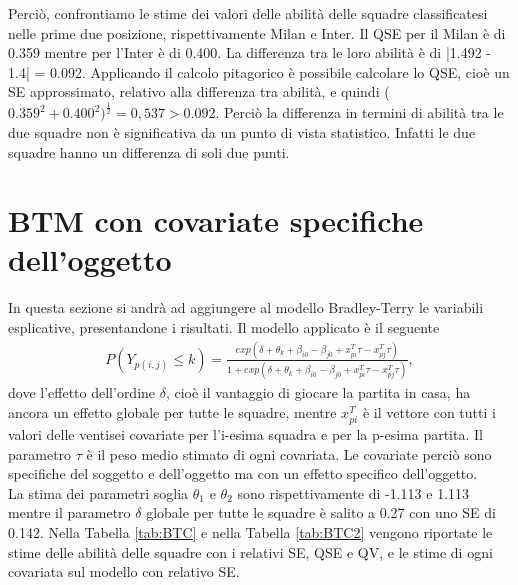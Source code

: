 Perciò, confrontiamo le stime dei valori delle abilità delle squadre classificatesi nelle prime due posizione, rispettivamente Milan e Inter. Il QSE per il Milan è di 0.359 mentre per l'Inter è di 0.400. La differenza tra le loro abilità è di |1.492 - 1.4| = 0.092. Applicando il calcolo pitagorico è possibile calcolare lo QSE, cioè un SE approssimato, relativo alla differenza tra abilità, e quindi ($0.359^2 + 0.400^2)^\frac{1}{2}=0,537 > 0.092$. Perciò la differenza in termini di abilità tra le due squadre non è significativa da un punto di vista statistico. Infatti le due squadre hanno un differenza di soli due punti.

\section{BTM con covariate specifiche dell'oggetto}
In questa sezione si andrà ad aggiungere al modello Bradley-Terry le variabili esplicative, presentandone i risultati. Il modello applicato è il seguente
\begin{align}
	P(Y_{p(i,j)}\leq k) =  \frac{exp(\delta + \theta_{k} + \beta_{i0} - \beta_{j0} + x^T_{pi}\tau - x^T_{pj}\tau)}{1 + exp(\delta + \theta_{k} + \beta_{i0} - \beta_{j0} + x^T_{pi}\tau - x^T_{pj}\tau)}, \label{for:5.1}
\end{align}
dove l'effetto dell'ordine $\delta$, cioè il vantaggio di giocare la partita in casa, ha ancora un effetto globale per tutte le squadre, mentre $x^T_{pi}$ è il vettore con tutti i valori delle ventisei covariate per l'i-esima squadra e per la p-esima partita. Il parametro $\tau$ è il peso medio stimato di ogni covariata. Le covariate perciò sono specifiche del soggetto e dell'oggetto ma con un effetto specifico dell'oggetto.\\
La stima dei parametri soglia $\theta_1$ e $\theta_2$ sono rispettivamente di -1.113 e 1.113 mentre il parametro $\delta$ globale per tutte le squadre è salito a 0.27 con uno SE di 0.142. Nella Tabella \ref{tab:BTC} e nella Tabella \ref{tab:BTC2} vengono riportate le stime delle abilità delle squadre con i relativi SE, QSE e QV, e le stime di ogni covariata sul modello con relativo SE.\\
